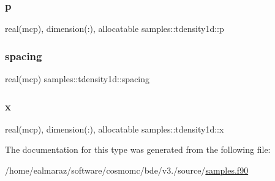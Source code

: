 \mbox{\label{structsamples_1_1tdensity1d_a0d8e56ff768b27935b7a81a4138479fb}} 
\subsubsection{\texorpdfstring{p}{p}}
{\footnotesize\ttfamily real(mcp), dimension(\+:), allocatable samples\+::tdensity1d\+::p}

\mbox{\label{structsamples_1_1tdensity1d_a61e4f6925a3999752f32466fa42d510a}} 
\subsubsection{\texorpdfstring{spacing}{spacing}}
{\footnotesize\ttfamily real(mcp) samples\+::tdensity1d\+::spacing}

\mbox{\label{structsamples_1_1tdensity1d_a9e769878fd6119f5571ffd04911dd348}} 
\subsubsection{\texorpdfstring{x}{x}}
{\footnotesize\ttfamily real(mcp), dimension(\+:), allocatable samples\+::tdensity1d\+::x}



The documentation for this type was generated from the following file\+:\begin{DoxyCompactItemize}
\item 
/home/ealmaraz/software/cosmomc/bde/v3./source/\mbox{\hyperlink{samples_8f90}{samples.\+f90}}\end{DoxyCompactItemize}
